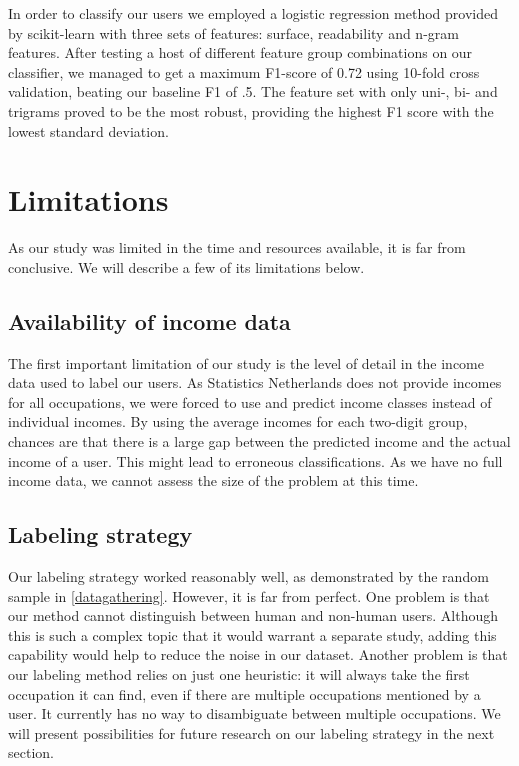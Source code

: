 \documentclass[
10pt, %
a4paper, %
oneside, %
headinclude,footinclude, %
] {book}%
\begin{document}
In order to classify our users we employed a logistic regression method provided by scikit-learn \citep{sklearn} with three sets of features: surface, readability and n-gram features. After testing a host of different feature group combinations on our classifier, we managed to get a maximum F1-score of 0.72 using 10-fold cross validation, beating our baseline F1 of .5. The feature set with only uni-, bi- and trigrams proved to be the most robust, providing the highest F1 score with the lowest standard deviation.

\section{Limitations}
As our study was limited in the time and resources available, it is far from conclusive. We will describe a few of its limitations below.

\subsection{Availability of income data}
The first important limitation of our study is the level of detail in the income data used to label our users. As Statistics Netherlands does not provide incomes for all occupations, we were forced to use and predict income classes instead of individual incomes. By using the average incomes for each two-digit group, chances are that there is a large gap between the predicted income and the actual income of a user. This might lead to erroneous classifications. As we have no full income data, we cannot assess the size of the problem at this time.

\subsection{Labeling strategy}
Our labeling strategy worked reasonably well, as demonstrated by the random sample in \autoref{datagathering}. However, it is far from perfect. One problem is that our method cannot distinguish between human and non-human users. Although this is such a complex topic that it would warrant a separate study, adding this capability would help to reduce the noise in our dataset. Another problem is that our labeling method relies on just one heuristic: it will always take the first occupation it can find, even if there are multiple occupations mentioned by a user. It currently has no way to disambiguate between multiple occupations. We will present possibilities for future research on our labeling strategy in the next section.
\end{document}
